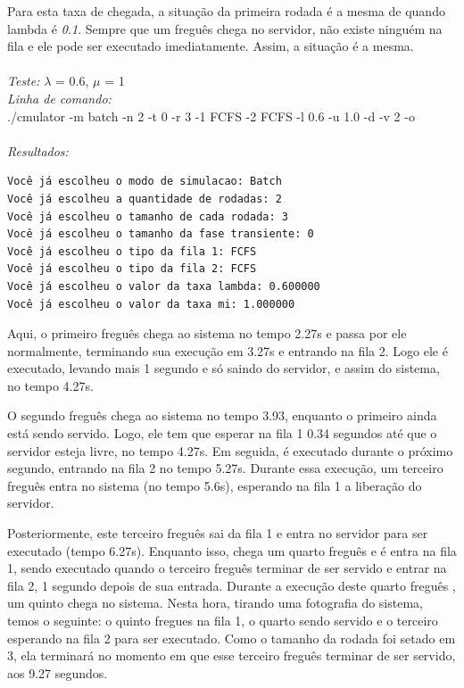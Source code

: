 \documentclass[a4paper,10pt]{article}
\begin{document}
    Para esta taxa de chegada, a situação da primeira rodada é a mesma de quando lambda é \emph{0.1}. Sempre que um freguês chega no servidor, não existe ninguém na fila e ele pode ser executado imediatamente. Assim, a situação é a mesma.
\\
\\
\emph{Teste:} $\lambda$ = 0.6, $\mu$ = 1
\\
\emph{Linha de comando:}
\\
./cmulator -m batch -n 2 -t 0 -r 3 -1 FCFS -2 FCFS -l 0.6 -u 1.0 -d -v 2 -o
\\
\\
\emph{Resultados:}
\\\begin{verbatim}
Você já escolheu o modo de simulacao: Batch
Você já escolheu a quantidade de rodadas: 2
Você já escolheu o tamanho de cada rodada: 3
Você já escolheu o tamanho da fase transiente: 0
Você já escolheu o tipo da fila 1: FCFS
Você já escolheu o tipo da fila 2: FCFS
Você já escolheu o valor da taxa lambda: 0.600000
Você já escolheu o valor da taxa mi: 1.000000
\end{verbatim}

    Aqui, o primeiro freguês chega ao sistema no tempo 2.27s e passa por ele normalmente, terminando sua execução em 3.27s e entrando na fila 2. Logo ele é executado, levando mais 1 segundo e só saindo do servidor, e assim do sistema, no tempo 4.27s.

    O segundo freguês chega ao sistema no tempo 3.93, enquanto o primeiro ainda está sendo servido. Logo, ele tem que esperar na fila 1 0.34 segundos até que o servidor esteja livre, no tempo 4.27s. Em seguida, é executado durante o próximo segundo, entrando na fila 2 no tempo 5.27s. Durante essa execução, um terceiro freguês entra no sistema (no tempo 5.6s), esperando na fila 1 a liberação do servidor.

    Posteriormente, este terceiro freguês sai da fila 1 e entra no servidor para ser executado (tempo 6.27s). Enquanto isso, chega um quarto freguês e é entra na fila 1, sendo executado quando o terceiro freguês terminar de ser servido e entrar na fila 2, 1 segundo depois de sua entrada. Durante a execução deste quarto freguês , um quinto chega no sistema. Nesta hora, tirando uma fotografia do sistema, temos o seguinte: o quinto fregues na fila 1, o quarto sendo servido e o terceiro esperando na fila 2 para ser executado. Como o tamanho da rodada foi setado em 3, ela terminará no momento em que esse terceiro freguês terminar de ser servido, aos 9.27 segundos.
\end{document}
